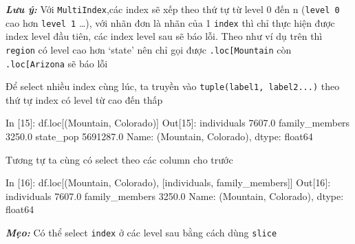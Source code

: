 \documentclass[
]{book}
\makeatletter
\newenvironment{Shaded}{\begin{snugshade}}{\end{snugshade}}
\newcommand{\DecValTok}[1]{\textcolor[rgb]{0.00,0.00,0.81}{#1}}
\newcommand{\FloatTok}[1]{\textcolor[rgb]{0.00,0.00,0.81}{#1}}
\newcommand{\NormalTok}[1]{#1}
\newcommand{\StringTok}[1]{\textcolor[rgb]{0.31,0.60,0.02}{#1}}
\newenvironment{kframe}{%
\medskip{}
\setlength{\fboxsep}{.8em}
 \def\at@end@of@kframe{}%
 \ifinner\ifhmode%
  \def\at@end@of@kframe{\end{minipage}}%
  \begin{minipage}{\columnwidth}%
 \fi\fi%
 \def\FrameCommand##1{\hskip\@totalleftmargin \hskip-\fboxsep
 \colorbox{shadecolor}{##1}\hskip-\fboxsep
     \hskip-\linewidth \hskip-\@totalleftmargin \hskip\columnwidth}%
 \MakeFramed {\advance\hsize-\width
   \@totalleftmargin\z@ \linewidth\hsize
   \@setminipage}}%
 {\par\unskip\endMakeFramed%
 \at@end@of@kframe}
\newenvironment{rmdblock}[1]
  {
  \begin{itemize}
  \renewcommand{\labelitemi}{
    \raisebox{-.7\height}[0pt][0pt]{
      {\setkeys{Gin}{width=3em,keepaspectratio}\texttt{[image: images/\#1]}}
    }
  }
  \setlength{\fboxsep}{1em}
  \begin{kframe}
  \item
  }
  {
  \end{kframe}
  \end{itemize}
  }
\newenvironment{rmdnote}
  {\begin{rmdblock}{note}}
  {\end{rmdblock}}
\newenvironment{rmdtip}
  {\begin{rmdblock}{tip}}
  {\end{rmdblock}}
\makeatother
\begin{document}
\begin{rmdnote}
\textbf{\emph{Lưu ý:}}
Với \texttt{MultiIndex},các index sẽ xếp theo thứ tự từ level 0 đến n (\texttt{level\ 0} cao hơn \texttt{level\ 1} \ldots), với nhãn đơn là nhãn của 1 \texttt{index} thì chỉ thực hiện được index level đầu tiên, các index level sau sẽ báo lỗi.
Theo như ví dụ trên thì \texttt{region} có level cao hơn `state' nên chỉ gọi được \texttt{.loc{[}\textquotesingle{}Mountain\textquotesingle{}{]}} còn \texttt{.loc{[}\textquotesingle{}Arizona\textquotesingle{}{]}} sẽ báo lỗi
\end{rmdnote}

Để select nhiều index cùng lúc, ta truyền vào \texttt{tuple(label1,\ label2...)} theo thứ tự index có level từ cao đến thấp

\begin{Shaded}
\begin{Highlighting}[]
\NormalTok{In [}\DecValTok{15}\NormalTok{]: df.loc[(}\StringTok{\textquotesingle{}Mountain\textquotesingle{}}\NormalTok{, }\StringTok{\textquotesingle{}Colorado\textquotesingle{}}\NormalTok{)]}
\NormalTok{Out[}\DecValTok{15}\NormalTok{]:}
\NormalTok{individuals          }\FloatTok{7607.0}
\NormalTok{family\_members       }\FloatTok{3250.0}
\NormalTok{state\_pop         }\FloatTok{5691287.0}
\NormalTok{Name: (Mountain, Colorado), dtype: float64}
\end{Highlighting}
\end{Shaded}

Tương tự ta cùng có select theo các column cho trước

\begin{Shaded}
\begin{Highlighting}[]
\NormalTok{In [}\DecValTok{16}\NormalTok{]: df.loc[(}\StringTok{\textquotesingle{}Mountain\textquotesingle{}}\NormalTok{, }\StringTok{\textquotesingle{}Colorado\textquotesingle{}}\NormalTok{), [}\StringTok{\textquotesingle{}individuals\textquotesingle{}}\NormalTok{, }\StringTok{\textquotesingle{}family\_members\textquotesingle{}}\NormalTok{]]}
\NormalTok{Out[}\DecValTok{16}\NormalTok{]:}
\NormalTok{individuals       }\FloatTok{7607.0}
\NormalTok{family\_members    }\FloatTok{3250.0}
\NormalTok{Name: (Mountain, Colorado), dtype: float64}
\end{Highlighting}
\end{Shaded}

\begin{rmdtip}
\textbf{\emph{Mẹo:}}
Có thể select \texttt{index} ở các level sau bằng cách dùng \texttt{slice}
\end{rmdtip}
\end{document}
